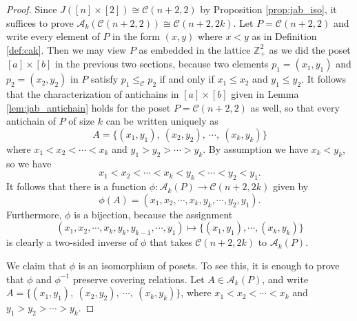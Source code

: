 \documentclass[10pt,a4paper]{amsart}
\newcommand{\Z}{{\mathbb Z}}
\newcommand{\akp}{\mathcal{A}_k(P)}
\newcommand{\cala}{\mathcal{A}}
\newcommand{\calc}{\mathcal{C}}
\newcommand{\inverse}{^{-1}}
\newcommand{\ra}{\rightarrow}
\begin{document}
\begin{proof}
Since $J([n]\times [2])\cong \calc(n+2,2)$ by Proposition \ref{prop:jab_iso}, it
suffices to prove $\cala_k(\calc(n+2,2))\cong \calc(n+2,2k)$. Let
$P=\calc(n+2,2)$ and write every element of $P$ in the form $(x,y)$ where $x<y$
as in Definition \ref{def:cak}. Then we may view $P$ as embedded in the lattice
$\Z_+^2$ as we did the poset $[a]\times[b]$ in the previous two sections, because two elements $p_1=(x_1,y_1)$ and
$p_2=(x_2,y_2)$ in $P$ satisfy $p_1\le_\calc p_2$ if and only if $x_1\le x_2$
and $y_1\le y_2$. It follows that the characterization of antichains in
$[a]\times [b]$ given in Lemma \ref{lem:jab_antichain}
holds for the poset $P=\calc(n+2,2)$ as well, so that
every antichain of $P$ of size $k$ can be written uniquely as 
\[
    A = \{ (x_1, y_1), \ (x_2, y_2), \ \cdots, \ (x_k, y_k)\}
\] 
where $x_1 < x_2 < \cdots < x_k$ and $y_1 > y_2 > \cdots > y_k$.
By assumption we have $x_k<y_k$, so we have 
\[
x_1<x_2<\cdots<x_k<y_k<\cdots<y_2<y_1. 
\] 
It follows that there is a function $\phi : \cala_k(P) \ra \calc(n+2, 2k)$ given
by $$ \phi(A) = (x_1, x_2, \cdots, x_k, y_k, \cdots, y_2, y_1).$$  Furthermore,
$\phi$ is a bijection, because the assignment 
\[
    (x_1, x_2,\cdots, x_k, y_k, y_{k-1},\cdots, y_1) \mapsto \{(x_1,y_1), \cdots, (x_k,y_k)\}
\]
is clearly a two-sided inverse of $\phi$ that takes $\calc(n+2,2k)$ to $\akp$.

We claim that $\phi$ is an isomorphism of posets. To see this, it is enough to
prove that $\phi$ and $\phi\inverse$ preserve covering relations. Let $A \in
\cala_k(P)$, and write $A = \{ (x_1, y_1), \ (x_2, y_2), \ \cdots, \ (x_k,
y_k)\}$, where $x_1 < x_2 < \cdots < x_k$ and $y_1 > y_2 > \cdots > y_k$.


\end{proof}
\end{document}
